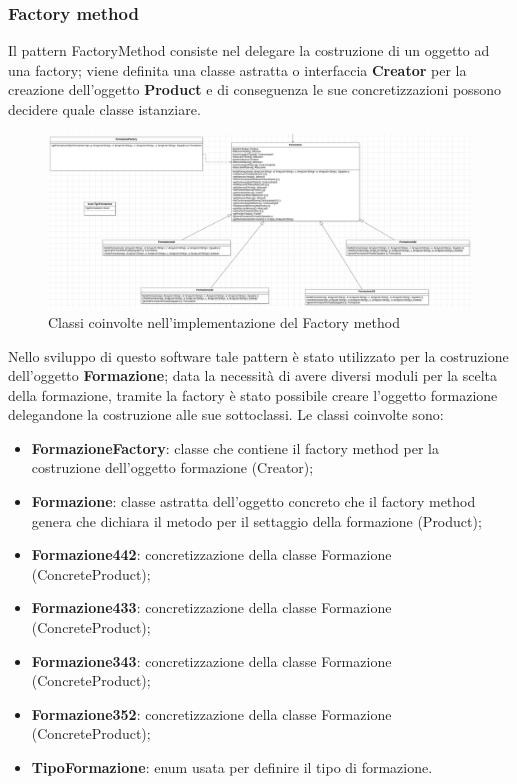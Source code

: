 \documentclass[12pt,a4paper]{article}
\begin{document}
\subsubsection{Factory method}
Il pattern FactoryMethod consiste nel delegare la costruzione di un oggetto ad una factory; viene definita una classe astratta o interfaccia  \textbf{Creator} per la creazione dell'oggetto \textbf{Product} e di conseguenza le sue concretizzazioni possono decidere quale classe istanziare.
\begin{figure}[h]
\centering
\includegraphics[width=18 cm ,keepaspectratio]{FactoryMethod.png}
\caption{Classi coinvolte nell'implementazione del Factory method}
\end{figure}
\newline
Nello sviluppo di questo software tale pattern è stato utilizzato per la costruzione dell'oggetto \textbf{Formazione}; data la necessità di avere diversi moduli per la scelta della formazione, tramite la factory è stato possibile creare l'oggetto formazione delegandone la costruzione alle sue sottoclassi. Le classi coinvolte sono:  
\begin{itemize}
\item \textbf{FormazioneFactory}: classe che contiene il factory method per la costruzione dell'oggetto formazione (Creator);
\item \textbf{Formazione}: classe astratta dell'oggetto concreto che il factory method genera che dichiara il metodo per il settaggio della formazione (Product);
\item \textbf{Formazione442}: concretizzazione della classe Formazione  (ConcreteProduct);
\item \textbf{Formazione433}: concretizzazione della classe Formazione  (ConcreteProduct);
\item \textbf{Formazione343}: concretizzazione della classe Formazione  (ConcreteProduct);
\item \textbf{Formazione352}: concretizzazione della classe Formazione  (ConcreteProduct);
\item \textbf{TipoFormazione}: enum usata per definire il tipo di formazione.
\end{itemize}
\newpage
\end{document}
